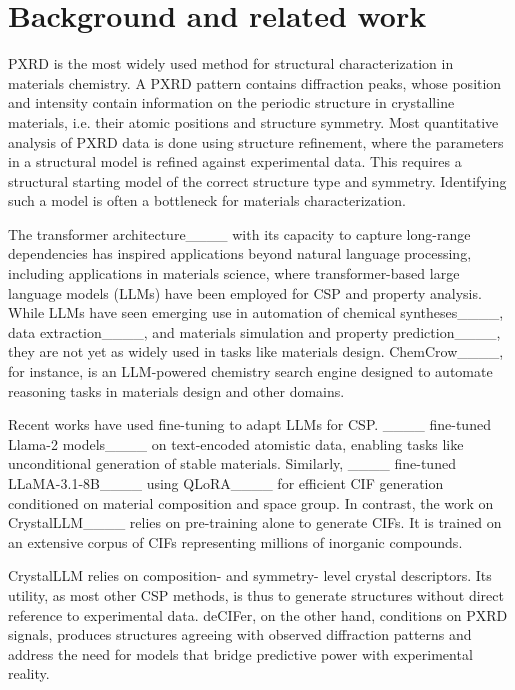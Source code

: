 \section{Background and related work}
PXRD is the most widely used method for structural characterization in materials chemistry. A PXRD pattern contains diffraction peaks, whose position and intensity contain information on the periodic structure in crystalline materials, i.e. their atomic positions and structure symmetry. Most quantitative analysis of PXRD data is done using structure refinement, where the parameters in a structural model is refined against experimental data. This requires a structural starting model of the correct structure type and symmetry. Identifying such a model is often a bottleneck for materials characterization.

The transformer architecture____ with its capacity to capture long-range dependencies has inspired applications beyond natural language processing, including applications in materials science, where transformer-based large language models (LLMs) have been employed for CSP and property analysis. While LLMs have seen emerging use in automation of chemical syntheses____, data extraction____, and materials simulation and property prediction____, they are not yet as widely used in tasks like materials design. ChemCrow____, for instance, is an LLM-powered chemistry search engine designed to automate reasoning tasks in materials design and other domains.

Recent works have used fine-tuning to adapt LLMs for CSP. ____ fine-tuned Llama-2 models____ on text-encoded atomistic data, enabling tasks like unconditional generation of stable materials. Similarly, ____ fine-tuned LLaMA-3.1-8B____ using QLoRA____ for efficient CIF generation conditioned on material composition and space group. In contrast, the work on CrystalLLM____ relies on pre-training alone to generate CIFs. It is trained on an extensive corpus of CIFs representing millions of inorganic compounds. 

CrystalLLM relies on composition- and symmetry- level crystal descriptors. Its utility, as most other CSP methods, is thus to generate structures without direct reference to experimental data. deCIFer, on the other hand, conditions on PXRD signals, produces structures agreeing with observed diffraction patterns and address the need for models that bridge predictive power with experimental reality.

